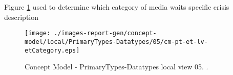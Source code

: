 Figure \ref{fig:lu.uni.lassy.excalibur.icrash-spec-CM-view-local-PrimaryTypes-Datatypes-05} used to determine which category of media waits specific crisis description



\begin{figure}[htbp] 
\label{fig:lu.uni.lassy.excalibur.icrash-spec-CM}
\begin{center}
\texttt{[image: ./images-report-gen/concept-model/local/PrimaryTypes-Datatypes/05/cm-pt-et-lv-etCategory.eps]}
\end{center}
\caption[Concept Model - PrimaryTypes-Datatypes local view 05 - ]{Concept Model - PrimaryTypes-Datatypes local view 05. .}
\label{fig:lu.uni.lassy.excalibur.icrash-spec-CM-view-local-PrimaryTypes-Datatypes-05}
\end{figure}
\vspace{0.5cm} 
